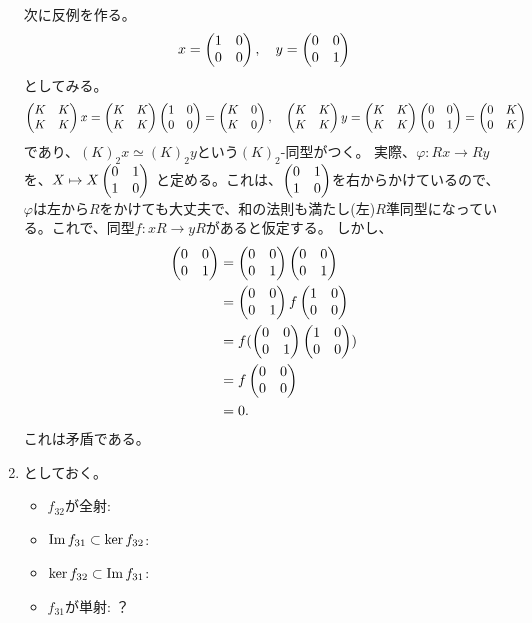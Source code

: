 \documentclass[9pt]{ltjsarticle}
\begin{document}
\begin{enumerate}[label=(問題\arabic*)]
次に反例を作る。
\begin{align}
  x = \tatev{1 & 0 \\ 0 & 0}, \quad
  y = \tatev{0 & 0 \\ 0 & 1}
\end{align}
としてみる。
\begin{align}
  \tatev{K & K \\ K & K}x
   =
   \tatev{K & K \\ K & K}\tatev{1 & 0 \\ 0 & 0}
   =
   \tatev{K & 0 \\ K & 0},\quad
   \tatev{K & K \\ K & K}y
    =
    \tatev{K & K \\ K & K}\tatev{0 & 0 \\ 0 & 1}
    =
    \tatev{0 & K \\ 0 & K}
\end{align}
であり、$(K)_2 x \simeq (K)_2 y$という$(K)_2$-同型がつく。
実際、$\varphi\colon Rx \to Ry$を、$X\mapsto X\tatev{0 & 1 \\ 1 & 0}$
と定める。これは、$\tatev{0 & 1 \\ 1 & 0}$を右からかけているので、
$\varphi$は左から$R$をかけても大丈夫で、和の法則も満たし(左)$R$準同型になっている。これで、同型$f\colon xR \to yR$があると仮定する。
しかし、
\begin{align}
  \tatev{0 & 0 \\ 0 & 1}
  &=
  \tatev{0 & 0 \\ 0 & 1}\tatev{0 & 0 \\ 0 & 1}\\
  &=
  \tatev{0 & 0 \\ 0 & 1}f\tatev{1 & 0 \\ 0 & 0}\\
  &=
  f(\tatev{0 & 0 \\ 0 & 1} \tatev{1 & 0 \\ 0 & 0})\\
  &=
  f\tatev{0 & 0 \\ 0 & 0}\\
  &=
  0.
\end{align}
これは矛盾である。

\item
{}
としておく。
\begin{itemize}
  \item $f_{32}$が全射:
  \item $\Image f_{31} \subset \ker f_{32}$:
  \item $\ker f_{32}\subset \Image f_{31}$:
  \item $f_{31}$が単射:
  ？
\end{itemize}

\end{enumerate}
\end{document}
